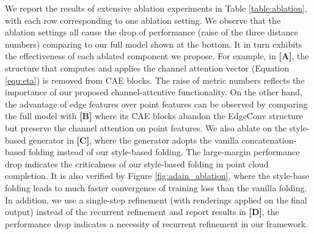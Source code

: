 \documentclass[final]{cvpr}
\begin{document}
We report the results of extensive ablation experiments in Table \ref{table:ablation}, with each row corresponding to one ablation setting. We observe that the ablation settings all cause the drop of performance (\ie raise of the three distance numbers) comparing to our full model shown at the bottom. It in turn exhibits the effectiveness of each ablated component we propose.
For example, in \textbf{[A]}, the structure that computes and applies the channel attention vector  (Equation \ref{equ:eta}) is removed from CAE blocks. The raise of metric numbers reflects the importance of our proposed channel-attentive functionality. 
On the other hand, the advantage of edge features over point features can be observed by comparing the full model with \textbf{[B]} where its CAE blocks abandon the EdgeConv structure but preserve the channel attention  on point features.
We also ablate on the style-based generator in \textbf{[C]}, where the generator  adopts the vanilla concatenation-based folding instead of our style-based folding. The large-margin performance drop indicates the criticalness of our style-based folding in point cloud completion. It is also verified by Figure \ref{fig:adain_ablation}, where the style-base folding leads to much faster convergence of training loss than the vanilla folding.
In addition, we use a single-step refinement (with renderings applied on the final output) instead of the recurrent refinement and report results in \textbf{[D]}, the performance drop indicates a necessity of recurrent refinement in our framework. 
\end{document}
